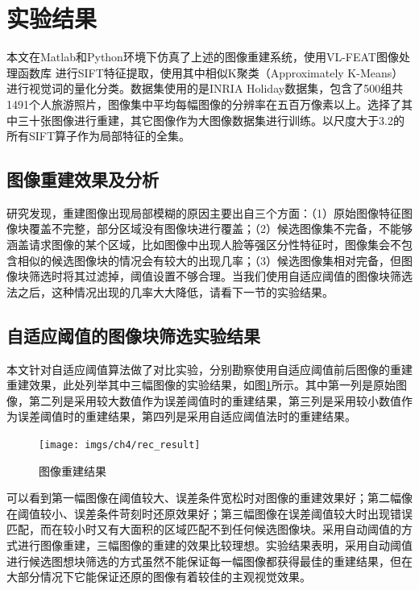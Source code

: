 \section{实验结果}
本文在Matlab和Python环境下仿真了上述的图像重建系统，使用VL-FEAT图像处理函数库
\cite{vl_feat}进行SIFT特征提取，使用其中相似K聚类（Approximately K-Means）进行视觉词的量化分类。数据集使用的是INRIA Holiday数据集\cite{INRIA}，包含了500组共1491个人旅游照片，图像集中平均每幅图像的分辨率在五百万像素以上。选择了其中三十张图像进行重建，其它图像作为大图像数据集进行训练。以尺度大于3.2的所有SIFT算子作为局部特征的全集。

\subsection{图像重建效果及分析}

研究发现，重建图像出现局部模糊的原因主要出自三个方面：（1）原始图像特征图像块覆盖不完整，部分区域没有图像块进行覆盖；（2）候选图像集不完备，不能够涵盖请求图像的某个区域，比如图像中出现人脸等强区分性特征时，图像集会不包含相似的候选图像块的情况会有较大的出现几率；（3）候选图像集相对完备，但图像块筛选时将其过滤掉，阈值设置不够合理。当我们使用自适应阈值的图像块筛选法之后，这种情况出现的几率大大降低，请看下一节的实验结果。

\subsection{自适应阈值的图像块筛选实验结果}
本文针对自适应阈值算法做了对比实验，分别勘察使用自适应阈值前后图像的重建重建效果，此处列举其中三幅图像的实验结果，如图\ref{fig:result}所示。其中第一列是原始图像，第二列是采用较大数值作为误差阈值时的重建结果，第三列是采用较小数值作为误差阈值时的重建结果，第四列是采用自适应阈值法时的重建结果。

\begin{figure}
\centering\texttt{[image: imgs/ch4/rec\_result]}
\caption{图像重建结果}
\label{fig:result}
\end{figure}

可以看到第一幅图像在阈值较大、误差条件宽松时对图像的重建效果好；第二幅像在阈值较小、误差条件苛刻时还原效果好；第三幅图像在误差阈值较大时出现错误匹配，而在较小时又有大面积的区域匹配不到任何候选图像块。采用自动阈值的方式进行图像重建，三幅图像的重建的效果比较理想。实验结果表明，采用自动阈值进行候选图想块筛选的方式虽然不能保证每一幅图像都获得最佳的重建结果，但在大部分情况下它能保证还原的图像有着较佳的主观视觉效果。


